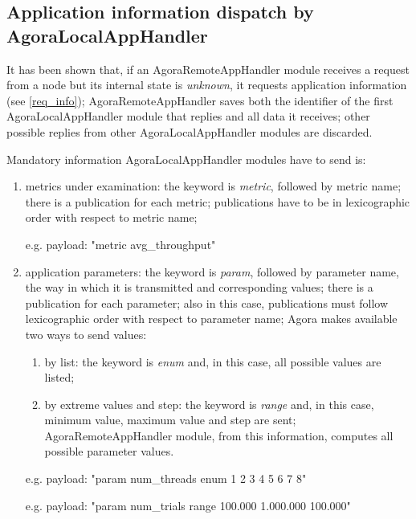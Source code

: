 \subsection{Application information dispatch by AgoraLocalAppHandler}\label{client_info}

It has been shown that, if an AgoraRemoteAppHandler module receives a request from a node but its internal state is \textit{unknown}, it requests application information (see \ref{req_info}); AgoraRemoteAppHandler saves both the identifier of the first AgoraLocalAppHandler module that replies and all data it receives; other possible replies from other AgoraLocalAppHandler modules are discarded.

Mandatory information AgoraLocalAppHandler modules have to send is:

\begin{enumerate}

    \item metrics under examination: the keyword is \textit{metric}, followed by metric name; there is a publication for each metric; publications have to be in lexicographic order with respect to metric name;
    
    e.g. payload: "metric avg\_throughput"
    
    \item application parameters: the keyword is \textit{param}, followed by parameter name, the way in which it is transmitted and corresponding values; there is a publication for each parameter; also in this case, publications must follow lexicographic order with respect to parameter name; Agora makes available two ways to send values:
    
    \begin{enumerate}
    
        \item by list: the keyword is \textit{enum} and, in this case, all possible values are listed;
        
        \item by extreme values and step: the keyword is \textit{range} and, in this case, minimum value, maximum value and step are sent; AgoraRemoteAppHandler module, from this information, computes all possible parameter values.
    
    \end{enumerate}
    
    e.g. payload: "param num\_threads enum 1 2 3 4 5 6 7 8"
    
    e.g. payload: "param num\_trials range 100.000 1.000.000 100.000"

\end{enumerate}

